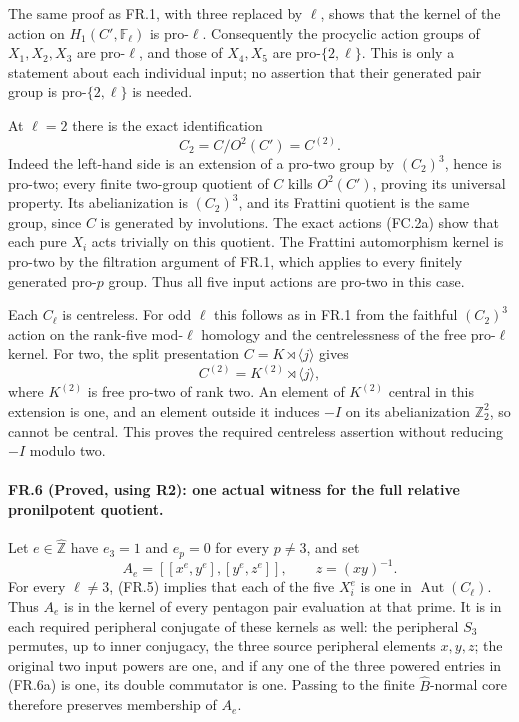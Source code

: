 The same proof as FR.1, with three replaced by $\ell$, shows
that the kernel of the action on $H_1(C',\mathbb F_\ell)$
is pro-$\ell$. Consequently the procyclic action groups of
$X_1,X_2,X_3$ are pro-$\ell$, and those of $X_4,X_5$
are pro-$\{2,\ell\}$. This is only a statement about each
individual input; no assertion that their generated pair
group is pro-$\{2,\ell\}$ is needed.

At $\ell=2$ there is the exact identification
\[
                   C_2=C/O^2(C')=C^{(2)}.
 \tag{FR.5c}
\]
Indeed the left-hand side is an extension of a pro-two group
by $(C_2)^3$, hence is pro-two; every finite two-group quotient
of $C$ kills $O^2(C')$, proving its universal property.
Its abelianization is $(C_2)^3$, and its Frattini quotient is
the same group, since $C$ is generated by involutions. The
exact actions (FC.2a) show that each pure $X_i$ acts trivially
on this quotient. The Frattini automorphism kernel is pro-two
by the filtration argument of FR.1, which applies to every
finitely generated pro-$p$ group. Thus all five input actions
are pro-two in this case.

Each $C_\ell$ is centreless. For odd $\ell$ this follows
as in FR.1 from the faithful $(C_2)^3$ action on the rank-five
mod-$\ell$ homology and the centrelessness of the free pro-$\ell$
kernel. For two, the split presentation $C=K\rtimes\langle j\rangle$
gives
\[
                  C^{(2)}=K^{(2)}\rtimes\langle j\rangle,
\]
where $K^{(2)}$ is free pro-two of rank two. An element of
$K^{(2)}$ central in this extension is one, and an element
outside it induces $-I$ on its abelianization $\mathbb Z_2^2$,
so cannot be central. This proves the required centreless
assertion without reducing $-I$ modulo two.

\paragraph{FR.6 (Proved, using R2): one actual witness for the full relative pronilpotent quotient.}
Let $e\in\widehat{\mathbb Z}$ have $e_3=1$ and $e_p=0$
for every $p\ne3$, and set
\[
                 A_e=[[x^e,y^e],[y^e,z^e]],
                 \qquad z=(xy)^{-1}.
 \tag{FR.6a}
\]
For every $\ell\ne3$, (FR.5) implies that each of the five
$X_i^e$ is one in $\operatorname{Aut}(C_\ell)$. Thus $A_e$
is in the kernel of every pentagon pair evaluation at that
prime. It is in each required peripheral conjugate of these
kernels as well: the peripheral $S_3$ permutes, up to inner
conjugacy, the three source peripheral elements $x,y,z$;
the original two input powers are one, and if any one of the
three powered entries in (FR.6a) is one, its double commutator
is one. Passing to the finite $\widehat B$-normal core therefore
preserves membership of $A_e$.

